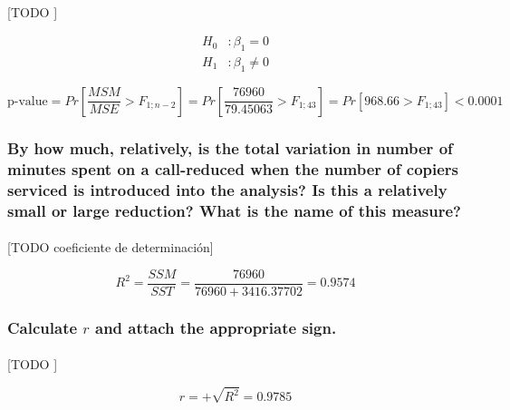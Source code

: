 \documentclass{article}
\begin{document}
        \paragraph{}
        [TODO ]

        \begin{equation}
          \begin{split}
            H_0&: \beta_1 = 0 \\
            H_1&: \beta_1 \neq 0
          \end{split}
        \end{equation}

        \begin{equation}
          \text{p-value} = Pr\left[\frac{MSM}{MSE} > F_{1;n-2}\right] =
          Pr\left[\frac{76960}{79.45063} > F_{1;43}\right] =
          Pr\left[968.66 > F_{1;43}\right] <
          0.0001
        \end{equation}

      \subsubsection{By how much, relatively, is the total variation in number of minutes spent on a call-reduced when the number of copiers serviced is introduced into the analysis? Is this a relatively small or large reduction? What is the name of this measure?}

        \paragraph{}
        [TODO coeficiente de determinación]

        \begin{equation}
          R^2 = \frac{SSM}{SST} = \frac{76960}{76960 + 3416.37702} = 0.9574
        \end{equation}

      \subsubsection{Calculate $r$ and attach the appropriate sign.}

        \paragraph{}
        [TODO ]

        \begin{equation}
          r = + \sqrt{R^2} = 0.9785
        \end{equation}
\end{document}
